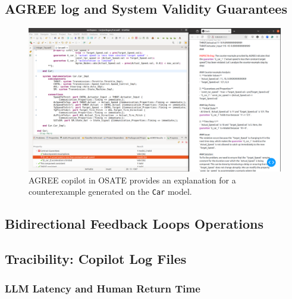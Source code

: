 \subsection{AGREE log and System Validity Guarantees}
\begin{figure}[t]  
    \centering
    \includegraphics[height=0.6\textwidth,width=\textwidth]{AGREE-DOG-high-rs.png}%
    \caption{AGREE copilot in OSATE provides an explanation for a counterexample generated on the \texttt{Car} model.}
    \label{fig:AGREEDOG}
\end{figure}
\subsection{Bidirectional Feedback Loops Operations}
\subsection{Tracibility: Copilot Log Files}
\subsubsection{LLM Latency and Human Return Time}

